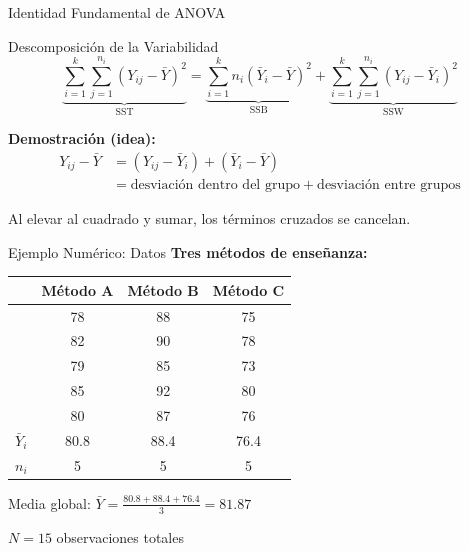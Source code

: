 \documentclass[10pt,aspectratio=169]{beamer}
\begin{document}
\begin{frame}{Identidad Fundamental de ANOVA}
\begin{alertblock}{Descomposición de la Variabilidad}
\begin{equation*}
\underbrace{\sum_{i=1}^{k} \sum_{j=1}^{n_i} (Y_{ij} - \bar{Y})^2}_{\text{SST}} = \underbrace{\sum_{i=1}^{k} n_i (\bar{Y}_i - \bar{Y})^2}_{\text{SSB}} + \underbrace{\sum_{i=1}^{k} \sum_{j=1}^{n_i} (Y_{ij} - \bar{Y}_i)^2}_{\text{SSW}}
\end{equation*}
\end{alertblock}

\vspace{0.5cm}

\textbf{Demostración (idea):}
\begin{align*}
Y_{ij} - \bar{Y} &= (Y_{ij} - \bar{Y}_i) + (\bar{Y}_i - \bar{Y}) \\
&= \text{desviación dentro del grupo} + \text{desviación entre grupos}
\end{align*}

Al elevar al cuadrado y sumar, los términos cruzados se cancelan.
\end{frame}

\begin{frame}{Ejemplo Numérico: Datos}
\textbf{Tres métodos de enseñanza:}

\begin{center}
\begin{tabular}{lccc}
\toprule
& Método A & Método B & Método C \\
\midrule
& 78 & 88 & 75 \\
& 82 & 90 & 78 \\
& 79 & 85 & 73 \\
& 85 & 92 & 80 \\
& 80 & 87 & 76 \\
\midrule
$\bar{Y}_i$ & 80.8 & 88.4 & 76.4 \\
$n_i$ & 5 & 5 & 5 \\
\bottomrule
\end{tabular}
\end{center}

\vspace{0.3cm}

Media global: $\bar{Y} = \frac{80.8 + 88.4 + 76.4}{3} = 81.87$

$N = 15$ observaciones totales
\end{frame}
\end{document}
